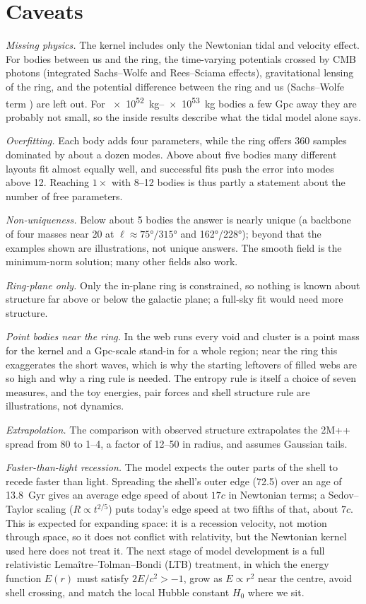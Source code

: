\documentclass[aps,prd,twocolumn,nofootinbib,superscriptaddress,floatfix]{revtex4-2}
\begin{document}
\FloatBarrier
\section{Caveats}\label{sec:caveats}
\emph{Missing physics.} The kernel includes only the Newtonian tidal and velocity effect. For bodies between us and the ring, the time-varying potentials crossed by CMB photons (integrated Sachs--Wolfe \cite{SachsWolfe1967} and Rees--Sciama \cite{ReesSciama1968} effects), gravitational lensing of the ring, and the potential difference between the ring and us (Sachs--Wolfe term \cite{SachsWolfe1967}) are left out. For \SIrange{e52}{e53}{\kilo\gram} bodies a few Gpc away they are probably not small, so the inside results describe what the tidal model alone says.

\emph{Overfitting.} Each body adds four parameters, while the ring offers 360 samples dominated by about a dozen modes. Above about five bodies many different layouts fit almost equally well, and successful fits push the error into modes above 12. Reaching $1\times$ with 8--12 bodies is thus partly a statement about the number of free parameters.

\emph{Non-uniqueness.} Below about 5 bodies the answer is nearly unique (a backbone of four masses near \SI{20}{\Gpc} at $\ell\approx\ang{75}/\ang{315}$ and \ang{162}/\ang{228}); beyond that the examples shown are illustrations, not unique answers. The smooth field is the minimum-norm solution; many other fields also work.

\emph{Ring-plane only.} Only the in-plane ring is constrained, so nothing is known about structure far above or below the galactic plane; a full-sky fit would need more structure.

\emph{Point bodies near the ring.} In the web runs every void and cluster is a point mass for the kernel and a Gpc-scale stand-in for a whole region; near the ring this exaggerates the short waves, which is why the starting leftovers of filled webs are so high and why a ring rule is needed. The entropy rule is itself a choice of seven measures, and the toy energies, pair forces and shell structure rule are illustrations, not dynamics.

\emph{Extrapolation.} The comparison with observed structure extrapolates the 2M++ spread from \SI{80}{\Mpc} to \SIrange{1}{4}{\Gpc}, a factor of 12--50 in radius, and assumes Gaussian tails.

\emph{Faster-than-light recession.} The model expects the outer parts of the shell to recede faster than light. Spreading the shell's outer edge (\SI{72.5}{\Gpc}) over an age of \SI{13.8}{Gyr} gives an average edge speed of about $17c$ in Newtonian terms; a Sedov--Taylor scaling ($R\propto t^{2/5}$) puts today's edge speed at two fifths of that, about $7c$. This is expected for expanding space: it is a recession velocity, not motion through space, so it does not conflict with relativity, but the Newtonian kernel used here does not treat it. The next stage of model development is a full relativistic Lema\^itre--Tolman--Bondi (LTB) treatment, in which the energy function $E(r)$ must satisfy $2E/c^2>-1$, grow as $E\propto r^2$ near the centre, avoid shell crossing, and match the local Hubble constant $H_0$ where we sit.
\end{document}
